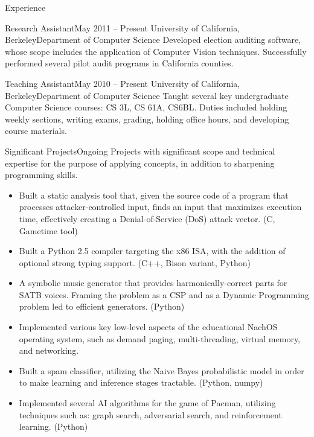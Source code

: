 \documentclass{resume}
\begin{document}
\begin{component}{Experience}
	\begin{position}{Research Assistant}{May 2011 -- Present}
	 	{University of California, Berkeley}{Department of Computer Science}
	{Developed election auditing software, whose scope includes the 
         application of Computer Vision techniques. Successfully performed
         several pilot audit programs in California counties.}
	\end{position}

	\begin{position}{Teaching Assistant}{May 2010 -- Present}
		{University of California, Berkeley}{Department of Computer Science}
	{Taught several key undergraduate Computer Science courses: CS 3L, CS 61A, CS6BL. 
	 Duties included holding weekly sections, writing exams, grading, 
	holding office hours, and developing course materials.}
	\end{position}

	\begin{position}{Significant Projects}{Ongoing}
		{}{\vspace{-1.0em}}
	{Projects with significant scope and technical expertise for the purpose of applying concepts, in addition to
	sharpening programming skills.}

	\begin{itemize}
		\vspace{-0.5em}\item Built a static analysis tool that, given the source code of a program that
		processes attacker-controlled input, finds an input that maximizes execution time, effectively
		creating a Denial-of-Service (DoS) attack vector. (C, Gametime tool)
		\vspace{-0.5em}\item Built a Python 2.5 compiler targeting the x86 ISA, with the addition of
		optional strong typing support. (C++, Bison variant, Python)
		\vspace{-0.5em}\item A symbolic music generator that provides harmonically-correct
		parts for SATB voices. Framing the problem as a CSP and as a Dynamic Programming problem led to efficient generators.
		(Python)
		\vspace{-0.5em}\item Implemented various key low-level aspects of the 
		educational NachOS operating system, such as demand paging, multi-threading, virtual memory, and 
		networking.
		\vspace{-0.5em}\item Built a spam classifier, utilizing the Naive Bayes probabilistic model in order to make
		learning and inference stages tractable. (Python, numpy)
		\vspace{-0.5em}\item Implemented several AI algorithms for the game of Pacman, utilizing
		techniques such as: graph search, adversarial search, and reinforcement learning. (Python)
	\end{itemize}
	\end{position}
\end{component}
\end{document}
